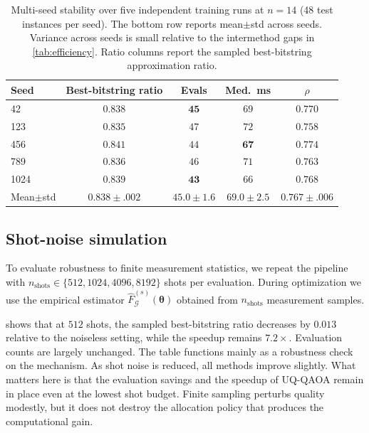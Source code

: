 \documentclass[aps,prx,reprint,superscriptaddress,longbibliography]{revtex4-2}
\newcommand{\UQQAOA}{\textnormal{\textsc{UQ-QAOA}}}
\newcommand{\calG}{\mathcal{G}}
\begin{document}
\begin{table}[t]
\caption{Multi-seed stability over five independent training runs at
$n{=}14$ (48 test instances per seed). The bottom row reports
mean$\pm$std across seeds. Variance across seeds is small relative to
the intermethod gaps in \cref{tab:efficiency}. Ratio columns report the
sampled best-bitstring approximation ratio.
\label{tab:multiseed}}
\begin{ruledtabular}
\scriptsize
\begin{tabular*}{\columnwidth}{@{\extracolsep{\fill}}lcccc}
    Seed & Best-bitstring ratio & Evals
    & Med.\ ms & $\rho$ \\
    \hline
    42  & $0.838$ & $\mathbf{45}$ & $69$ & $\mathbf{0.770}$ \\
    123 & $0.835$ & $47$ & $72$ & $0.758$ \\
    456 & $\mathbf{0.841}$ & $44$ & $\mathbf{67}$ & $0.774$ \\
    789 & $0.836$ & $46$ & $71$ & $0.763$ \\
    1024 & $0.839$ & $\mathbf{43}$ & $66$ & $0.768$ \\
    \hline
    Mean$\pm$std
      & $0.838\pm .002$
      & $45.0\pm 1.6$
      & $69.0\pm 2.5$
      & $0.767\pm .006$ \\
\end{tabular*}
\end{ruledtabular}
\end{table}

\subsection{Shot-noise simulation}
\label{sec:shot_noise}

To evaluate robustness to finite measurement statistics, we repeat the
pipeline with $n_{\mathrm{shots}} \in \{512,1024,4096,8192\}$ shots per
evaluation. During optimization we use the empirical estimator
$\hat{F}^{(s)}_\calG(\bm\theta)$ obtained from $n_{\mathrm{shots}}$
measurement samples.

 shows that at $512$ shots, the sampled
best-bitstring ratio decreases by $0.013$ relative to the noiseless
setting, while the speedup remains $7.2\times$. Evaluation counts are
largely unchanged.
The table functions mainly as a robustness check on the mechanism. As
shot noise is reduced, all methods improve slightly. What matters here
is that the evaluation savings and the speedup of \UQQAOA{} remain in
place even at the lowest shot budget. Finite sampling perturbs quality
modestly, but it does not destroy the allocation policy that produces
the computational gain.
\end{document}
